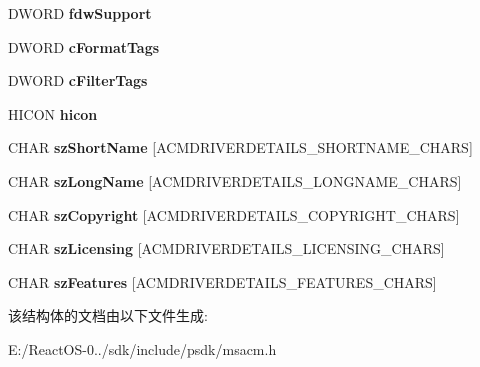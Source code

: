 \begin{DoxyCompactItemize}
\mbox{\label{struct___a_c_m_d_r_i_v_e_r_d_e_t_a_i_l_s_a_acb59ac5512e9aafe6340f12347b60561}} 
D\+W\+O\+RD {\bfseries fdw\+Support}
\item 
\mbox{\label{struct___a_c_m_d_r_i_v_e_r_d_e_t_a_i_l_s_a_ae1b9f4248903e17673f0d612572ea553}} 
D\+W\+O\+RD {\bfseries c\+Format\+Tags}
\item 
\mbox{\label{struct___a_c_m_d_r_i_v_e_r_d_e_t_a_i_l_s_a_a88babd010ad34ff0e8fe3b0b681a34ea}} 
D\+W\+O\+RD {\bfseries c\+Filter\+Tags}
\item 
\mbox{\label{struct___a_c_m_d_r_i_v_e_r_d_e_t_a_i_l_s_a_a355c2a9824d4e03dbea3acf69dfc5b2a}} 
H\+I\+C\+ON {\bfseries hicon}
\item 
\mbox{\label{struct___a_c_m_d_r_i_v_e_r_d_e_t_a_i_l_s_a_a706751eecc5890cb05a1f5d3bbec64bd}} 
C\+H\+AR {\bfseries sz\+Short\+Name} \mbox{[}A\+C\+M\+D\+R\+I\+V\+E\+R\+D\+E\+T\+A\+I\+L\+S\+\_\+\+S\+H\+O\+R\+T\+N\+A\+M\+E\+\_\+\+C\+H\+A\+RS\mbox{]}
\item 
\mbox{\label{struct___a_c_m_d_r_i_v_e_r_d_e_t_a_i_l_s_a_adfd3e723a8c783df1d795d384e8bf78d}} 
C\+H\+AR {\bfseries sz\+Long\+Name} \mbox{[}A\+C\+M\+D\+R\+I\+V\+E\+R\+D\+E\+T\+A\+I\+L\+S\+\_\+\+L\+O\+N\+G\+N\+A\+M\+E\+\_\+\+C\+H\+A\+RS\mbox{]}
\item 
\mbox{\label{struct___a_c_m_d_r_i_v_e_r_d_e_t_a_i_l_s_a_a4317058f643efaccd83e5922322e89a0}} 
C\+H\+AR {\bfseries sz\+Copyright} \mbox{[}A\+C\+M\+D\+R\+I\+V\+E\+R\+D\+E\+T\+A\+I\+L\+S\+\_\+\+C\+O\+P\+Y\+R\+I\+G\+H\+T\+\_\+\+C\+H\+A\+RS\mbox{]}
\item 
\mbox{\label{struct___a_c_m_d_r_i_v_e_r_d_e_t_a_i_l_s_a_a527b4c76d3797c2f762404f51b146ae0}} 
C\+H\+AR {\bfseries sz\+Licensing} \mbox{[}A\+C\+M\+D\+R\+I\+V\+E\+R\+D\+E\+T\+A\+I\+L\+S\+\_\+\+L\+I\+C\+E\+N\+S\+I\+N\+G\+\_\+\+C\+H\+A\+RS\mbox{]}
\item 
\mbox{\label{struct___a_c_m_d_r_i_v_e_r_d_e_t_a_i_l_s_a_a21d499b2bf7147795a94b96995986707}} 
C\+H\+AR {\bfseries sz\+Features} \mbox{[}A\+C\+M\+D\+R\+I\+V\+E\+R\+D\+E\+T\+A\+I\+L\+S\+\_\+\+F\+E\+A\+T\+U\+R\+E\+S\+\_\+\+C\+H\+A\+RS\mbox{]}
\end{DoxyCompactItemize}


该结构体的文档由以下文件生成\+:\begin{DoxyCompactItemize}
\item 
E\+:/\+React\+O\+S-\/0../sdk/include/psdk/msacm.\+h\end{DoxyCompactItemize}
